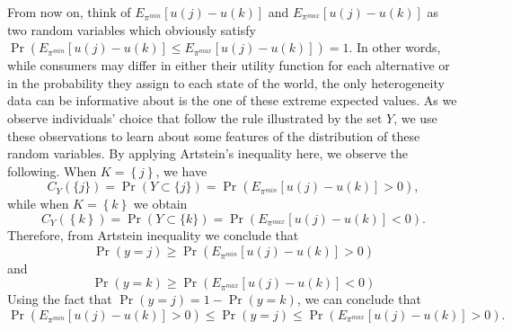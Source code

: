 \documentclass[reqno]{article}
\begin{document}
From now on, think of $E_{\pi ^{min}}\left[ u\left( j\right) -u\left(
k\right) \right] $ and $E_{\pi ^{max}}\left[ u\left( j\right) -u\left(
k\right) \right] $ as two random variables which obviously satisfy $\Pr
\left( E_{\pi ^{min}}\left[ u\left( j\right) -u\left( k\right) \right] \leq
E_{\pi ^{max}}\left[ u\left( j\right) -u\left( k\right) \right] \right) =1$.
In other words, while consumers may differ in either their utility function
for each alternative or in the probability they assign to each state of the
world, the only heterogeneity data can be informative about is the one of
these extreme expected values. As we observe individuals' choice that follow
the rule illustrated by the set $Y$, we use these observations to learn
about some features of the distribution of these random variables. By
applying Artstein's inequality here, we observe the following. When $%
K=\left\{ j\right\} $, we have 
\begin{equation*}
C_{Y}\left( \{j\}\right) =\Pr \left( Y\subset \{j\}\right) =\Pr \left(
E_{\pi ^{min}}\left[ u\left( j\right) -u\left( k\right) \right] >0\right) ,
\end{equation*}%
while when $K=\left\{ k\right\} $ we obtain 
\begin{equation*}
C_{Y}\left( \left\{ k\right\} \right) =\Pr \left( Y\subset \{k\}\right) =\Pr
\left( E_{\pi ^{max}}\left[ u\left( j\right) -u\left( k\right) \right]
<0\right) .
\end{equation*}%
Therefore, from Artstein inequality we conclude that%
\begin{equation*}
\Pr (y=j)\geq \Pr \left( E_{\pi ^{min}}\left[ u\left( j\right) -u\left(
k\right) \right] >0\right)
\end{equation*}%
and 
\begin{equation*}
\Pr \left( y=k\right) \geq \Pr \left( E_{\pi ^{max}}\left[ u\left( j\right)
-u\left( k\right) \right] <0\right)
\end{equation*}%
Using the fact that $\Pr \left( y=j\right) =1-\Pr (y=k)$, we can conclude
that 
\begin{equation*}
\Pr \left( E_{\pi ^{min}}\left[ u\left( j\right) -u\left( k\right) \right]
>0\right) \leq \Pr (y=j)\leq \Pr \left( E_{\pi ^{max}}\left[ u\left(
j\right) -u\left( k\right) \right] >0\right) .
\end{equation*}
\end{document}
